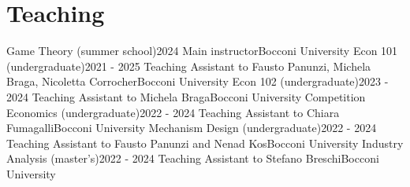 \documentclass[A4,11pt]{article}
\newcommand{\CVSubHeadingListStart}{\begin{itemize}[leftmargin=0.5cm, label={}]}
\newcommand{\CVSubHeadingListEnd}{\end{itemize}}
\begin{document}
\section{Teaching}
\CVSubHeadingListStart
\CVSubheading
{Game Theory (summer school)}{2024}
{Main instructor}{Bocconi University}{} 
\CVSubheading
{Econ 101 (undergraduate)}{2021 - 2025}
{Teaching Assistant to Fausto Panunzi, Michela Braga, Nicoletta Corrocher}{Bocconi University}{}
\CVSubheading
{Econ 102 (undergraduate)}{2023 - 2024}
{Teaching Assistant to Michela Braga}{Bocconi University}{}
\CVSubheading
{Competition Economics (undergraduate)}{2022 - 2024}
{Teaching Assistant to Chiara Fumagalli}{Bocconi University}{}
\CVSubheading
{Mechanism Design (undergraduate)}{2022 - 2024}
{Teaching Assistant to Fausto Panunzi and Nenad Kos}{Bocconi University}{}
\CVSubheading
{Industry Analysis (master's)}{2022 - 2024}
{Teaching Assistant to Stefano Breschi}{Bocconi University}{}
\CVSubHeadingListEnd
\end{document}
